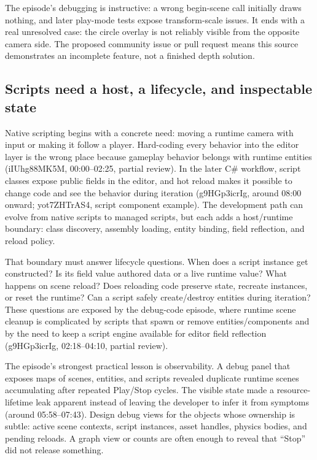 The episode's debugging is instructive: a wrong begin-scene call initially draws nothing, and later play-mode tests expose transform-scale issues. It ends with a real unresolved case: the circle overlay is not reliably visible from the opposite camera side. The proposed community issue or pull request means this source demonstrates an incomplete feature, not a finished depth solution.

\subsection{Scripts need a host, a lifecycle, and inspectable state}\label{06-engine-ii-ch033-scripts-need-a-host-a-lifecycle-and-inspectable-state}

\hypertarget{06-engine-ii-ch033-scripts-need-a-host-a-lifecycle-and-inspectable-state}{}

Native scripting begins with a concrete need: moving a runtime camera with input or making it follow a player. Hard-coding every behavior into the editor layer is the wrong place because gameplay behavior belongs with runtime entities (iIUhg88MK5M, 00:00--02:25, partial review). In the later C\# workflow, script classes expose public fields in the editor, and hot reload makes it possible to change code and see the behavior during iteration (g9HGp3icrIg, around 08:00 onward; yot7ZHTrAS4, script component example). The development path can evolve from native scripts to managed scripts, but each adds a host/runtime boundary: class discovery, assembly loading, entity binding, field reflection, and reload policy.

That boundary must answer lifecycle questions. When does a script instance get constructed? Is its field value authored data or a live runtime value? What happens on scene reload? Does reloading code preserve state, recreate instances, or reset the runtime? Can a script safely create/destroy entities during iteration? These questions are exposed by the debug-code episode, where runtime scene cleanup is complicated by scripts that spawn or remove entities/components and by the need to keep a script engine available for editor field reflection (g9HGp3icrIg, 02:18--04:10, partial review).

The episode's strongest practical lesson is observability. A debug panel that exposes maps of scenes, entities, and scripts revealed duplicate runtime scenes accumulating after repeated Play/Stop cycles. The visible state made a resource-lifetime leak apparent instead of leaving the developer to infer it from symptoms (around 05:58--07:43). Design debug views for the objects whose ownership is subtle: active scene contexts, script instances, asset handles, physics bodies, and pending reloads. A graph view or counts are often enough to reveal that ``Stop'' did not release something.

